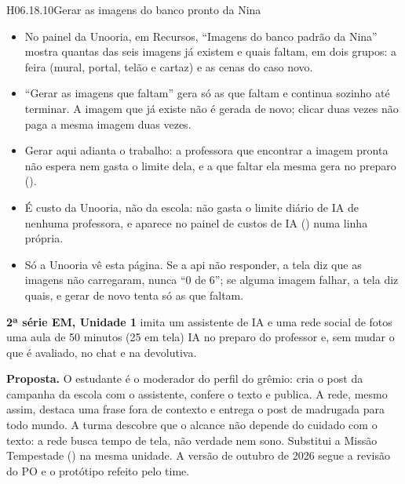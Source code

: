\begin{historia}{H06.18.10}{Gerar as imagens do banco pronto da Nina}{\pronto}
\aceite
\begin{itemize}
  \item No painel da Unooria, em Recursos, \enquote{Imagens do banco padrão
    da Nina} mostra quantas das seis imagens já existem e quais faltam, em dois
    grupos: a feira (mural, portal, telão e cartaz) e as cenas do caso novo.
  \item \enquote{Gerar as imagens que faltam} gera só as que faltam e
    continua sozinho até terminar. A imagem que já existe não é gerada de novo;
    clicar duas vezes não paga a mesma imagem duas vezes.
  \item Gerar aqui adianta o trabalho: a professora que encontrar a imagem
    pronta não espera nem gasta o limite dela, e a que faltar ela mesma gera
    no preparo ().
  \item É custo da Unooria, não da escola: não gasta o limite diário de IA de
    nenhuma professora, e aparece no painel de custos de IA () numa
    linha própria.
  \item Só a Unooria vê esta página. Se a api não responder, a tela diz que as
    imagens não carregaram, nunca \enquote{0 de 6}; se alguma imagem falhar, a
    tela diz quais, e gerar de novo tenta só as que faltam.
\end{itemize}
\end{historia}


\textbf{2ª série EM, Unidade 1} \textperiodcentered{} imita um assistente de
IA e uma rede social de fotos \textperiodcentered{} uma aula de 50 minutos
(25 em tela) \textperiodcentered{} IA no preparo do professor e, sem mudar
o que é avaliado, no chat e na devolutiva.

\textbf{Proposta.} O estudante é o moderador do perfil do grêmio: cria o post
da campanha da escola com o assistente, confere o texto e publica. A rede,
mesmo assim, destaca uma frase fora de contexto e entrega o post de madrugada
para todo mundo. A turma descobre que o alcance não depende do cuidado com o
texto: a rede busca tempo de tela, não verdade nem sono. Substitui a Missão
Tempestade () na mesma unidade. A versão de outubro de 2026 segue a
revisão do PO e o protótipo refeito pelo time.

